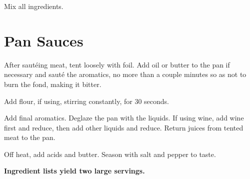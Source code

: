 \documentclass[oneside]{book}  %
\def\thisrecipe{}  %
\newcommand{\recipe}[1]{\section{#1}\def\thisrecipe{: #1}} %
\begin{document}
\begin{directions}
  \item Mix all ingredients.
\end{directions}
\recipe{Pan Sauces} \label{recipe:pan_sauces} %

\begin{directions}
  \item After saut\'eing meat, tent loosely with foil. Add oil or butter to the
    pan if necessary and saut\'e the aromatics, no more than a couple minutes
    so as not to burn the fond, making it bitter.

  \item Add flour, if using, stirring constantly, for 30 seconds.

  \item Add final aromatics. Deglaze the pan with the liquids. If using wine,
    add wine first and reduce, then add other liquids and reduce. Return juices
    from tented meat to the pan.

  \item Off heat, add acids and butter. Season with salt and pepper to taste.
\end{directions}

\noindent\textbf{Ingredient lists yield two large servings.}
\end{document}
